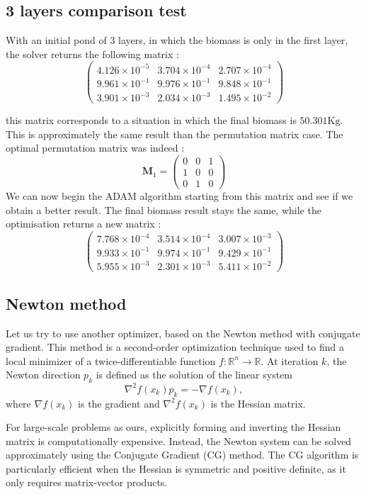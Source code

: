 \documentclass{article}
\begin{document}
\subsection{3 layers comparison test}
With an initial pond of 3 layers, in which the biomass is only in the first layer, the solver returns the following matrix :
\[
\begin{pmatrix}
4.126\times 10^{-5} & 3.704\times 10^{-4} & 2.707\times 10^{-4} \\
9.961\times 10^{-1} & 9.976\times 10^{-1} & 9.848\times 10^{-1} \\
3.901\times 10^{-3} & 2.034\times 10^{-3} & 1.495\times 10^{-2}
\end{pmatrix}
\]


this matrix corresponds to a situation in which the final biomass is $50.301 \text{Kg}$. This is approximately the same result than the permutation matrix case. 
The optimal permutation matrix was indeed :
\[
\mathbf{M}_1 =
\begin{pmatrix}
0 & 0 & 1 \\
1 & 0 & 0 \\
0 & 1 & 0
\end{pmatrix}
\]
We can now begin the ADAM algorithm starting from this matrix and see if we obtain a better result. The final biomass result stays the same, while the optimisation returns a new matrix :
\[
\begin{pmatrix}
7.768 \times 10^{-4} & 3.514 \times 10^{-4} & 3.007 \times 10^{-3} \\
9.933 \times 10^{-1} & 9.974 \times 10^{-1} & 9.429 \times 10^{-1} \\
5.955 \times 10^{-3} & 2.301 \times 10^{-3} & 5.411 \times 10^{-2}
\end{pmatrix}
\]
\subsection{Newton method}
Let us try to use another optimizer, based on the Newton method with conjugate gradient.
This method is a second-order optimization technique used to find a local minimizer of a twice-differentiable function $f : \mathbb{R}^n \to \mathbb{R}$. 
At iteration $k$, the Newton direction $p_k$ is defined as the solution of the linear system
\[
\nabla^2 f(x_k) p_k = -\nabla f(x_k),
\]
where $\nabla f(x_k)$ is the gradient and $\nabla^2 f(x_k)$ is the Hessian matrix.

For large-scale problems as ours, explicitly forming and inverting the Hessian matrix is computationally expensive. 
Instead, the Newton system can be solved approximately using the Conjugate Gradient (CG) method. 
The CG algorithm is particularly efficient when the Hessian is symmetric and positive definite, as it only requires matrix-vector products.
\end{document}
